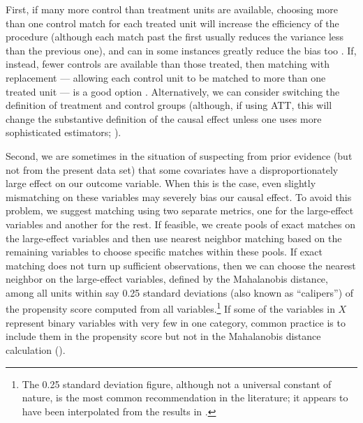 \documentclass[11pt,titlepage]{article}
\begin{document}
First, if many more control than treatment units are available,
choosing more than one control match for each treated unit will
increase the efficiency of the procedure (although each match past the
first usually reduces the variance less than the previous one), and
can in some instances greatly reduce the bias too \citep{Smith97}.
If, instead, fewer controls are available than those treated, then
matching with replacement --- allowing each control unit to be matched
to more than one treated unit --- is a good option \citep{DehWah99}.
Alternatively, we can consider switching the definition of treatment
and control groups (although, if using ATT, this will change the
substantive definition of the causal effect unless one uses more
sophisticated estimators; \citealt{Lechner00}).

Second, we are sometimes in the situation of suspecting from prior
evidence (but not from the present data set) that some covariates have
a disproportionately large effect on our outcome variable.  When this
is the case, even slightly mismatching on these variables may severely
bias our causal effect.  To avoid this problem, we suggest matching
using two separate metrics, one for the large-effect variables and
another for the rest.  If feasible, we create pools of exact matches
on the large-effect variables and then use nearest neighbor matching
based on the remaining variables to choose specific matches within
these pools.  If exact matching does not turn up sufficient
observations, then we can choose the nearest neighbor on the
large-effect variables, defined by the Mahalanobis distance, among all
units within say 0.25 standard deviations (also known as ``calipers'')
of the propensity score computed from all variables.\footnote{The 0.25
  standard deviation figure, although not a universal constant of
  nature, is the most common recommendation in the literature; it
  appears to have been interpolated from the results in
  \citet{CocRub73}.}  If some of the variables in $X$ represent binary
variables with very few in one category, common practice is to include
them in the propensity score but not in the Mahalanobis distance
calculation (\citealp{GuRos93, RubTho00}).
\end{document}
